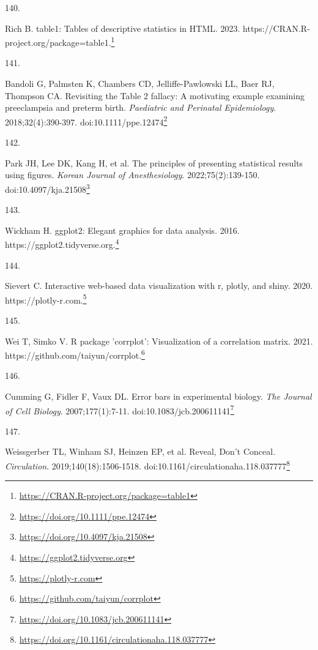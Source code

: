 \documentclass[
  a4paper,
]{book}
\newlength{\cslhangindent}
\newlength{\csllabelwidth}
\newlength{\cslentryspacingunit} %
\newenvironment{CSLReferences}[2] %
 {%
  \setlength{\parindent}{0pt}
  \ifodd #1
  \let\oldpar\par
  \def\par{\hangindent=\cslhangindent\oldpar}
  \fi
  \setlength{\parskip}{#2\cslentryspacingunit}
 }%
 {}
\newcommand{\CSLLeftMargin}[1]{\parbox[t]{\csllabelwidth}{#1}}
\newcommand{\CSLRightInline}[1]{\parbox[t]{\linewidth - \csllabelwidth}{#1}\break}
\renewcommand{\href}[2]{#2\footnote{\url{#1}}}
\begin{document}
\begin{CSLReferences}{0}{0}
\leavevmode{}%
\CSLLeftMargin{140. }%
\CSLRightInline{Rich B. table1: Tables of descriptive statistics in HTML. 2023. \href{https://CRAN.R-project.org/package=table1}{https://CRAN.R-project.org/package=table1.}}

\leavevmode{}%
\CSLLeftMargin{141. }%
\CSLRightInline{Bandoli G, Palmsten K, Chambers CD, Jelliffe-Pawlowski LL, Baer RJ, Thompson CA. Revisiting the Table 2 fallacy: A motivating example examining preeclampsia and preterm birth. \emph{Paediatric and Perinatal Epidemiology}. 2018;32(4):390-397. doi:\href{https://doi.org/10.1111/ppe.12474}{10.1111/ppe.12474}}

\leavevmode{}%
\CSLLeftMargin{142. }%
\CSLRightInline{Park JH, Lee DK, Kang H, et al. The principles of presenting statistical results using figures. \emph{Korean Journal of Anesthesiology}. 2022;75(2):139-150. doi:\href{https://doi.org/10.4097/kja.21508}{10.4097/kja.21508}}

\leavevmode{}%
\CSLLeftMargin{143. }%
\CSLRightInline{Wickham H. ggplot2: Elegant graphics for data analysis. 2016. \href{https://ggplot2.tidyverse.org}{https://ggplot2.tidyverse.org.}}

\leavevmode{}%
\CSLLeftMargin{144. }%
\CSLRightInline{Sievert C. Interactive web-based data visualization with r, plotly, and shiny. 2020. \href{https://plotly-r.com}{https://plotly-r.com.}}

\leavevmode{}%
\CSLLeftMargin{145. }%
\CSLRightInline{Wei T, Simko V. R package 'corrplot': Visualization of a correlation matrix. 2021. \href{https://github.com/taiyun/corrplot}{https://github.com/taiyun/corrplot.}}

\leavevmode{}%
\CSLLeftMargin{146. }%
\CSLRightInline{Cumming G, Fidler F, Vaux DL. Error bars in experimental biology. \emph{The Journal of Cell Biology}. 2007;177(1):7-11. doi:\href{https://doi.org/10.1083/jcb.200611141}{10.1083/jcb.200611141}}

\leavevmode{}%
\CSLLeftMargin{147. }%
\CSLRightInline{Weissgerber TL, Winham SJ, Heinzen EP, et al. Reveal, Don{'}t Conceal. \emph{Circulation}. 2019;140(18):1506-1518. doi:\href{https://doi.org/10.1161/circulationaha.118.037777}{10.1161/circulationaha.118.037777}}


\end{CSLReferences}
\end{document}
